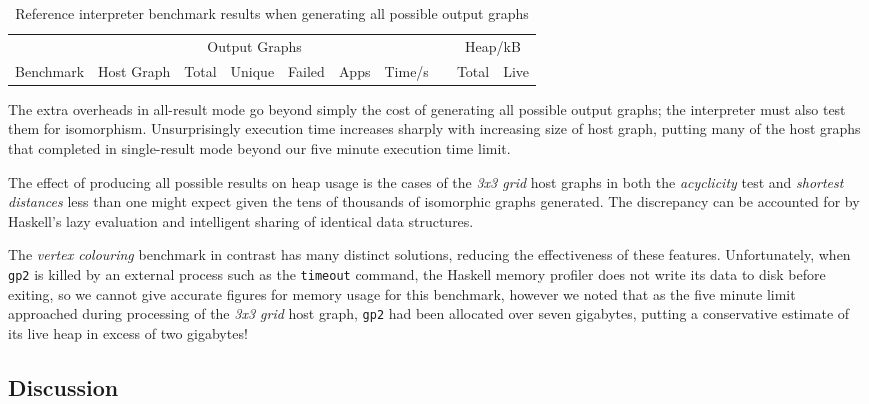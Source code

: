 \begin{table}[h]
\begin{minipage}{\textwidth}
\centering

\begin{tabular}{llrrrrrcrr}
\hline 
&  & \multicolumn{3}{c}{Output Graphs} & & && \multicolumn{2}{c}{Heap/kB}\\
Benchmark          & Host Graph & Total & Unique   & Failed & Apps & Time/s   & & Total  & Live \\
\hline 

\end{tabular}

\caption[Reference interpreter benchmarks]{Reference interpreter benchmark results when generating all possible output graphs}

\label{table:resultsAll}
\end{minipage}
\end{table}

The extra overheads in all-result mode go beyond simply the cost of generating all possible output graphs; the interpreter must also test them for isomorphism. Unsurprisingly execution time increases sharply with increasing size of host graph, putting many of the host graphs that completed in single-result mode beyond our five minute execution time limit.

The effect of producing all possible results on heap usage is the cases of the \textit{3x3 grid} host graphs in both the \textit{acyclicity} test and \textit{shortest distances} less than one might expect given the tens of thousands of isomorphic graphs generated. The discrepancy can be accounted for by Haskell's lazy evaluation and intelligent sharing of identical data structures.

The \textit{vertex colouring} benchmark in contrast has many distinct solutions, reducing the effectiveness of these features. Unfortunately, when \texttt{gp2} is killed by an external process such as the \texttt{timeout} command, the Haskell memory profiler does not write its data to disk before exiting, so we cannot give accurate figures for memory usage for this benchmark, however we noted that as the five minute limit approached during processing of the \textit{3x3 grid} host graph, \texttt{gp2} had been allocated over seven gigabytes, putting a conservative estimate of its live heap in excess of two gigabytes!


\subsection{Discussion}


